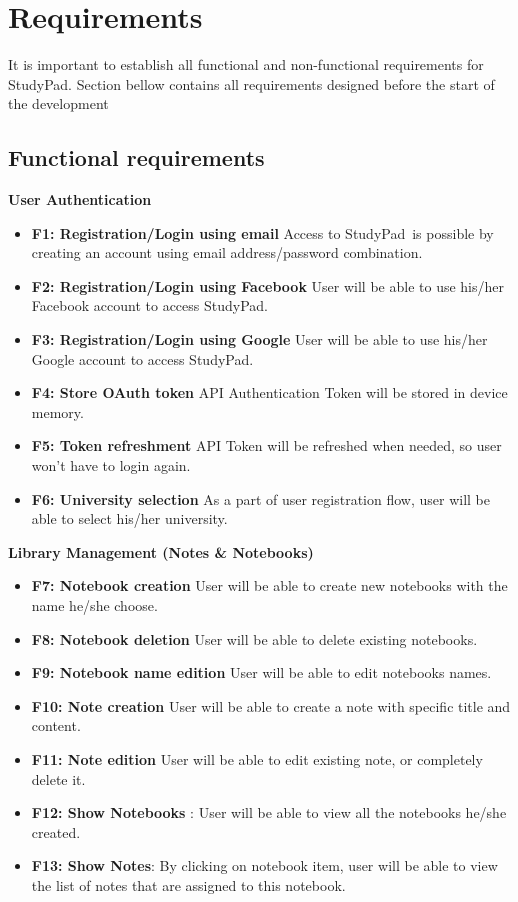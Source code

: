 \documentclass[thesis=B,english]{FITthesis}[2012/10/20]
\newcommand{\appname}{StudyPad}
\begin{document}
\newpage
\section{Requirements}
It is important to establish all functional and non-functional requirements for \appname. Section bellow contains all requirements designed before the start
of the development

\subsection{Functional requirements}
\bigskip
\textbf{User Authentication}
\begin{itemize}
	\item \textbf{F1: Registration/Login using email} Access to \appname\ is possible by creating an account using email address/password combination.
	\item \textbf{F2: Registration/Login using Facebook} User will be able to use his/her Facebook account to access \appname.
	\item \textbf{F3: Registration/Login using Google} User will be able to use his/her Google account to access \appname.
	\item \textbf{F4: Store OAuth token} API Authentication Token will be stored in device memory.
	\item \textbf{F5: Token refreshment} API Token will be refreshed when needed, so user won't have to login again.
	\item \textbf{F6: University selection} As a part of user registration flow, user will be able to select his/her university.
\end{itemize}
\bigskip
\textbf{Library Management (Notes \& Notebooks)}
\begin{itemize}
	\item \textbf{F7: Notebook creation} User will be able to create new notebooks with the name he/she choose.
	\item \textbf{F8: Notebook deletion} User will be able to delete existing notebooks.
	\item \textbf{F9: Notebook name edition} User will be able to edit notebooks names.
	\item \textbf{F10: Note creation} User will be able to create a note with specific title and content.
	\item \textbf{F11: Note edition} User will be able to edit existing note, or completely delete it.
	\item \textbf{F12: Show Notebooks} : User will be able to view all the notebooks he/she created.
	\item \textbf{F13: Show Notes}: By clicking on notebook item, user will be able to view the list of notes that are assigned to this notebook.
\end{itemize}
\end{document}
